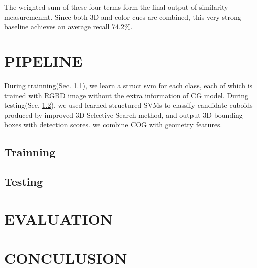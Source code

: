 \documentclass[english]{ccdconf}
\begin{document}
The weighted sum of these four terms form the final output of similarity measuremenmt. Since both 3D and color cues are combined,
this very strong baseline achieves an average recall 74.2\%.
\section{PIPELINE}
During trainning(Sec. \ref{Train}), we learn a struct svm for each class, each of which is trained with RGBD image without the extra information of CG model. During testing(Sec. \ref{Test}), we used learned structured SVMs to classify candidate cuboids produced by improved 3D Selective Search method, and output 3D bounding boxes with detection scores. we combine COG with geometry features.
\subsection{Trainning}
\label{Train}
\subsection{Testing}
\label{Test}
\section{EVALUATION}
\section{CONCULUSION}
%
\end{document}
